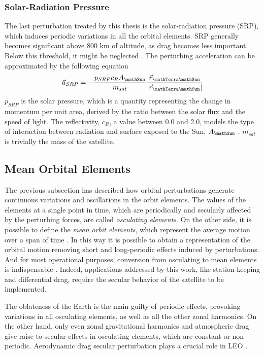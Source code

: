 \subsubsection{Solar-Radiation Pressure}
The last perturbation treated by this thesis is the solar-radiation pressure (SRP), which induces periodic variations in all the orbital elements.
SRP generally becomes significant above 800 km of altitude, as drag becomes less important. Below this threshold, it might be neglected \cite{wertz2009orbit}.
The perturbing acceleration can be approximated by the following equation \cite{vallado2013fundamentals}
\begin{equation} \label{eq:srp_acc}
    \vec{a}_{SRP} = - \frac{p_{SRP} c_{R} A_{\mathSun}}{m_{sat}} \frac{\vec{r}_{\mathTerra \mathSun}}{|\vec{r}_{\mathTerra \mathSun}|}
\end{equation}
$p_{SRP}$ is the solar pressure, which is a quantity representing the change in momentum per unit area, derived by the ratio between the solar flux and the speed of light.
The reflectivity, $c_R$, a value between 0.0 and 2.0, models the type of interaction between radiation and surface exposed to the Sun, $A_{\mathSun}$ \cite{vallado2013fundamentals}.
$m_{sat}$ is trivially the mass of the satellite.


\subsection{Mean Orbital Elements}
The previous subsection has described how orbital perturbations generate continuous variations and oscillations in the orbit elements.
The values of the elements at a single point in time, which are periodically and secularly affected by the perturbing forces, are called \textit{osculating elements}.
On the other side, it is possible to define the \textit{mean orbit elements}, which represent the average motion over a span of time \cite{wertz2009orbit}.
In this way it is possible to obtain a representation of the orbital motion removing short and long-periodic effects induced by perturbations.
And for most operational purposes, conversion from osculating to mean elements is indispensable \cite{walter1967conversion}.
Indeed, applications addressed by this work, like station-keeping and differential drag, require the secular behavior of the satellite to be implemented.

The oblateness of the Earth is the main guilty of periodic effects, provoking variations in all osculating elements, as well as all the other zonal harmonics.
On the other hand, only even zonal gravitational harmonics and atmospheric drag give raise to secular effects in osculating elements, which are constant or non-periodic.
Aerodynamic drag secular perturbation plays a crucial role in LEO \cite{der1996conversion}.

